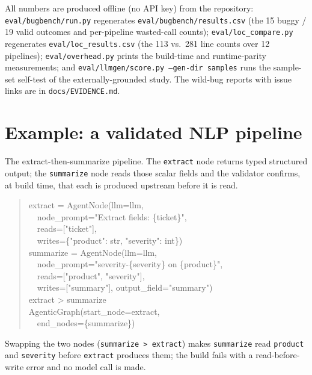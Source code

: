 \documentclass[11pt]{article}
\newcommand{\code}[1]{\texttt{#1}}
\begin{document}
All numbers are produced offline (no API key) from the repository:
\code{eval/bugbench/run.py} regenerates \code{eval/bugbench/results.csv} (the 15
buggy / 19 valid outcomes and per-pipeline wasted-call counts);
\code{eval/loc\_compare.py} regenerates \code{eval/loc\_results.csv} (the 113
vs.\ 281 line counts over 12 pipelines); \code{eval/overhead.py} prints the
build-time and runtime-parity measurements; and
\code{eval/llmgen/score.py --gen-dir samples} runs the sample-set self-test of
the externally-grounded study. The wild-bug reports with issue links are in
\code{docs/EVIDENCE.md}.

\section{Example: a validated NLP pipeline}
\label{app:example}

The extract-then-summarize pipeline. The \code{extract} node returns typed
structured output; the \code{summarize} node reads those scalar fields and the
validator confirms, at build time, that each is produced upstream before it is
read.

\begin{quote}\small\ttfamily
extract = AgentNode(llm=llm,\\
\ \ node\_prompt="Extract fields: \{ticket\}",\\
\ \ reads=["ticket"],\\
\ \ writes=\{"product": str, "severity": int\})\\
summarize = AgentNode(llm=llm,\\
\ \ node\_prompt="severity-\{severity\} on \{product\}",\\
\ \ reads=["product", "severity"],\\
\ \ writes=["summary"], output\_field="summary")\\
extract > summarize\\
AgenticGraph(start\_node=extract,\\
\ \ end\_nodes=\{summarize\})
\end{quote}

Swapping the two nodes (\code{summarize > extract}) makes \code{summarize} read
\code{product} and \code{severity} before \code{extract} produces them; the build
fails with a read-before-write error and no model call is made.
\end{document}
